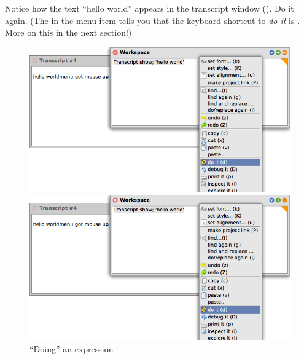 \documentclass[a4paper,10pt,twoside]{book}
\begin{document}
Notice how the text ``hello world'' appears in the transcript window
().
Do it again.
(The  in the menu item  tells you that the keyboard shortcut to \emph{do it} is . More on this in the next section!)

\begin{figure}[htb]
\ifluluelse
	{\centerline {\includegraphics[width=\textwidth]{Doit}}}
	{\centerline {\includegraphics[scale=0.7]{Doit}}}
\caption{``Doing'' an expression\label{fig:doit}}
\end{figure}
\end{document}
